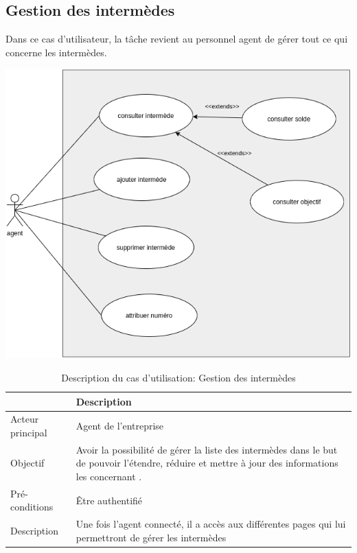 		\subsection*{Gestion des intermèdes}
			Dans ce cas d'utilisateur, la tâche revient au personnel agent de gérer tout ce qui concerne les intermèdes.
			\begin{center}
				\includegraphics[scale=0.5]{chap_2/use-intermede.png}
				\label{cas d'utilisateur gestion des intermèdes}
			\end{center}
			\begin{table}[!h]
				\begin{center}
					{\renewcommand{\arraystretch}{1.5}\begin{tabularx}{\textwidth}{|l|X|}
							\hline & Description \\
							\hline Acteur principal & Agent de l'entreprise \\
							\hline Objectif & Avoir la possibilité de gérer la liste des intermèdes dans le but de pouvoir l'étendre, réduire et mettre à jour des informations les concernant .\\
							\hline Pré-conditions & Être authentifié\\
							\hline Description & Une fois l'agent connecté, il a accès aux différentes pages qui lui permettront de gérer les intermèdes
							\\
							\hline              
					\end{tabularx}}
				\end{center}
				\caption{Description du cas d'utilisation: Gestion des intermèdes}
			\end{table}
